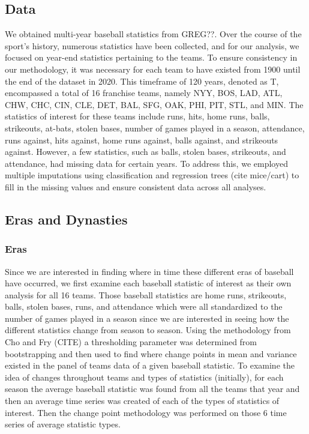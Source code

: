 \documentclass[
  12pt,
]{article}
\begin{document}
\hypertarget{data}{%
\subsection{Data}\label{data}}

We obtained multi-year baseball statistics from GREG??. Over the course
of the sport's history, numerous statistics have been collected, and for
our analysis, we focused on year-end statistics pertaining to the teams.
To ensure consistency in our methodology, it was necessary for each team
to have existed from 1900 until the end of the dataset in 2020. This
timeframe of 120 years, denoted as T, encompassed a total of 16
franchise teams, namely NYY, BOS, LAD, ATL, CHW, CHC, CIN, CLE, DET,
BAL, SFG, OAK, PHI, PIT, STL, and MIN. The statistics of interest for
these teams include runs, hits, home runs, balls, strikeouts, at-bats,
stolen bases, number of games played in a season, attendance, runs
against, hits against, home runs against, balls against, and strikeouts
against. However, a few statistics, such as balls, stolen bases,
strikeouts, and attendance, had missing data for certain years. To
address this, we employed multiple imputations using classification and
regression trees (cite mice/cart) to fill in the missing values and
ensure consistent data across all analyses.

\hypertarget{eras-and-dynasties}{%
\subsection{Eras and Dynasties}\label{eras-and-dynasties}}

\hypertarget{eras}{%
\subsubsection{Eras}\label{eras}}

Since we are interested in finding where in time these different eras of
baseball have occurred, we first examine each baseball statistic of
interest as their own analysis for all 16 teams. Those baseball
statistics are home runs, strikeouts, balls, stolen bases, runs, and
attendance which were all standardized to the number of games played in
a season since we are interested in seeing how the different statistics
change from season to season. Using the methodology from Cho and Fry
(CITE) a thresholding parameter was determined from bootstrapping and
then used to find where change points in mean and variance existed in
the panel of teams data of a given baseball statistic. To examine the
idea of changes throughout teams and types of statistics (initially),
for each season the average baseball statistic was found from all the
teams that year and then an average time series was created of each of
the types of statistics of interest. Then the change point methodology
was performed on those 6 time series of average statistic types.
\end{document}
